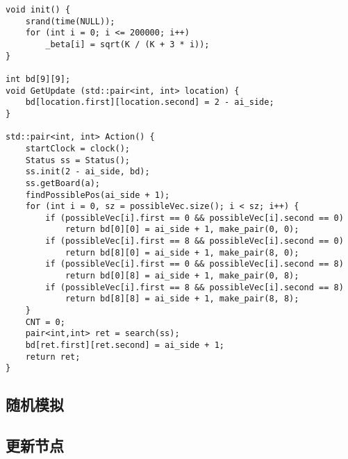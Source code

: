 \documentclass[UTF8]{article}
\theoremstyle{definition}
\begin{document}
\begin{lstlisting}
void init() {
    srand(time(NULL));
    for (int i = 0; i <= 200000; i++)
        _beta[i] = sqrt(K / (K + 3 * i));
}

int bd[9][9];
void GetUpdate (std::pair<int, int> location) {
    bd[location.first][location.second] = 2 - ai_side;
}

std::pair<int, int> Action() {
    startClock = clock();
    Status ss = Status();
    ss.init(2 - ai_side, bd);
    ss.getBoard(a);
    findPossiblePos(ai_side + 1);
    for (int i = 0, sz = possibleVec.size(); i < sz; i++) {
        if (possibleVec[i].first == 0 && possibleVec[i].second == 0)
            return bd[0][0] = ai_side + 1, make_pair(0, 0);
        if (possibleVec[i].first == 8 && possibleVec[i].second == 0)
            return bd[8][0] = ai_side + 1, make_pair(8, 0);
        if (possibleVec[i].first == 0 && possibleVec[i].second == 8)
            return bd[0][8] = ai_side + 1, make_pair(0, 8);
        if (possibleVec[i].first == 8 && possibleVec[i].second == 8)
            return bd[8][8] = ai_side + 1, make_pair(8, 8);
    }
    CNT = 0;
    pair<int,int> ret = search(ss);
    bd[ret.first][ret.second] = ai_side + 1;
    return ret;
}
\end{lstlisting}

\subsection{随机模拟}


\subsection{更新节点}
\end{document}
